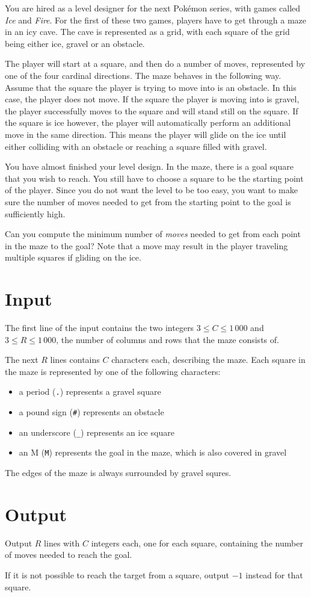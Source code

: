 You are hired as a level designer for the next Pokémon series, with games called \emph{Ice} and \emph{Fire}.
For the first of these two games, players have to get through a maze in an icy cave.
The cave is represented as a grid, with each square of the grid being either ice, gravel or an obstacle.

The player will start at a square, and then do a number of moves, represented by one of the four cardinal directions.
The maze behaves in the following way.
Assume that the square the player is trying to move into is an obstacle.
In this case, the player does not move.
If the square the player is moving into is gravel, the player successfully moves to the square and will stand still on the square.
If the square is ice however, the player will automatically perform an additional move in the same direction.
This means the player will glide on the ice until either colliding with an obstacle or reaching a square filled with gravel.

You have almost finished your level design.
In the maze, there is a goal square that you wish to reach.
You still have to choose a square to be the starting point of the player.
Since you do not want the level to be too easy, you want to make sure the number of moves needed to get from the starting point to the goal is sufficiently high.

Can you compute the minimum number of \emph{moves} needed to get from each point in the maze to the goal?
Note that a move may result in the player traveling multiple squares if gliding on the ice.

\section*{Input}
The first line of the input contains the two integers $3 \le C \le 1\,000$ and $3 \le R \le 1\,000$, the number of columns and rows that the maze consists of.

The next $R$ lines contains $C$ characters each, describing the maze.
Each square in the maze is represented by one of the following characters:
\begin{itemize}
\item a period (\texttt{.}) represents a gravel square
\item a pound sign (\texttt{\#}) represents an obstacle
\item an underscore (\texttt{\_}) represents an ice square
\item an M (\texttt{M}) represents the goal in the maze, which is also covered in gravel
\end{itemize}

The edges of the maze is always surrounded by gravel squres.

\section*{Output}
Output $R$ lines with $C$ integers each, one for each square, containing the number of moves needed to reach the goal.

If it is not possible to reach the target from a square, output $-1$ instead for that square.
